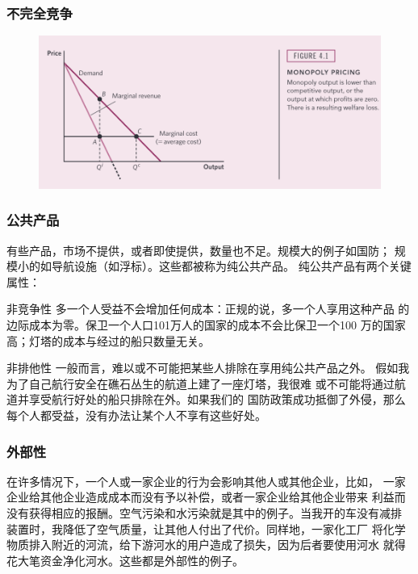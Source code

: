 \documentclass[aspectratio=169, 12pt]{beamer}
\begin{document}
\begin{frame}[plain]
    \frametitle{不完全竞争}
    \begin{figure}
        \centering
        \includegraphics[width=1.0\textwidth]{./resources/figure/monopoly.png}
    \end{figure}
\end{frame}

\begin{frame}[plain]
    \frametitle{公共产品}
    有些产品，市场不提供，或者即使提供，数量也不足。规模大的例子如国防；
    规模小的如导航设施（如浮标）。这些都被称为纯公共产品。
    纯公共产品有两个关键属性：
    \begin{block}{非竞争性}
        多一个人受益不会增加任何成本：正规的说，多一个人享用这种产品
        的边际成本为零。保卫一个人口101万人的国家的成本不会比保卫一个100
        万的国家高；灯塔的成本与经过的船只数量无关。
    \end{block}
    \begin{block}{非排他性}
        一般而言，难以或不可能把某些人排除在享用纯公共产品之外。
        假如我为了自己航行安全在礁石丛生的航道上建了一座灯塔，我很难
        或不可能将通过航道并享受航行好处的船只排除在外。如果我们的
        国防政策成功抵御了外侵，那么每个人都受益，没有办法让某个人不享有这些好处。
    \end{block}
\end{frame}

\begin{frame}[plain]
    \frametitle{外部性}
    在许多情况下，一个人或一家企业的行为会影响其他人或其他企业，比如，
    一家企业给其他企业造成成本而没有予以补偿，或者一家企业给其他企业带来
    利益而没有获得相应的报酬。空气污染和水污染就是其中的例子。当我开的车没有减排
    装置时，我降低了空气质量，让其他人付出了代价。同样地，一家化工厂
    将化学物质排入附近的河流，给下游河水的用户造成了损失，因为后者要使用河水
    就得花大笔资金净化河水。这些都是外部性的例子。
\end{frame}
\end{document}
